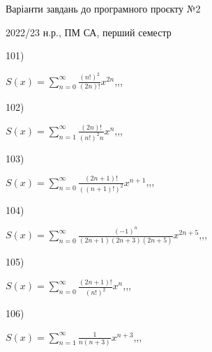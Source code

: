 \documentclass[11pt, ukrainian]{article}
\begin{document}
{\Large \center  Варіанти завдань до програмного проєкту №2\par 2022/23 н.р., ПМ СА, перший семестр\par \bigskip}

101) \space 
{%
{$S(x)=\sum\limits_{n=0}^{\infty}{\frac{(n!)^2}{(2n)!}}{x^{{2n}}}$},,, \par \smallskip  
}
\par
\vspace{0.9cm}
102) \space 
{%
{$S(x)=\sum\limits_{n=1}^{\infty}{\frac{(2n)!}{{(n!)^2}n}}{x^{n}}$},,, \par \smallskip  
}
\par
\vspace{0.9cm}
103) \space 
{%
{$S(x)=\sum\limits_{n=0}^{\infty}{\frac{(2n+1)!}{((n+1)!)^2}}{x^{{n+1}}}$},,, \par \smallskip  
}
\par
\vspace{0.9cm}
104) \space 
{%
{$S(x)=\sum\limits_{n=0}^{\infty}{\frac{(-1)^n}{(2n+1)(2n+3)(2n+5)}}{x^{{2n+5}}}$},,, \par \smallskip  
}
\par
\vspace{0.9cm}
105) \space 
{%
{$S(x)=\sum\limits_{n=0}^{\infty}{\frac{(2n+1)!}{(n!)^2}}{x^{n}}$},,, \par \smallskip  
}
\par
\vspace{0.9cm}
106) \space 
{%
{$S(x)=\sum\limits_{n=1}^{\infty}{\frac{1}{n(n+3)}}{x^{{n+3}}}$},,, \par \smallskip  
}
\end{document}
